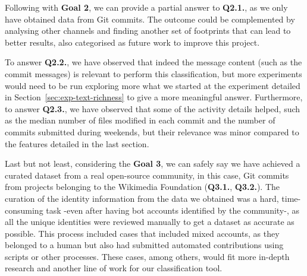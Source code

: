 \documentclass[a4paper, 12pt]{book}
\begin{document}
Following with \textbf{Goal 2}, we can provide a partial answer to \textbf{Q2.1.}, as we only have obtained data from Git commits. The outcome could be complemented by analysing other channels and finding another set of footprints that can lead to better results, also categorised as future work to improve this project.

To answer \textbf{Q2.2.}, we have observed that indeed the message content (such as the commit messages) is relevant to perform this classification, but more experiments would need to be run exploring more what we started at the experiment detailed in Section~\ref{sec:exp-text-richness} to give a more meaningful answer. Furthermore, to answer \textbf{Q2.3.}, we have observed that some of the activity details helped, such as the median number of files modified in each commit and the number of commits submitted during weekends, but their relevance was minor compared to the features detailed in the last section.

Last but not least, considering the \textbf{Goal 3}, we can safely say we have achieved a curated dataset from a real open-source community, in this case, Git commits from projects belonging to the Wikimedia Foundation (\textbf{Q3.1.}, \textbf{Q3.2.}). The curation of the identity information from the data we obtained was a hard, time-consuming task -even after having bot accounts identified by the community-, as all the unique identities were reviewed manually to get a dataset as accurate as possible. This process included cases that included mixed accounts, as they belonged to a human but also had submitted automated contributions using scripts or other processes. These cases, among others, would fit more in-depth research and another line of work for our classification tool.




\end{document}
